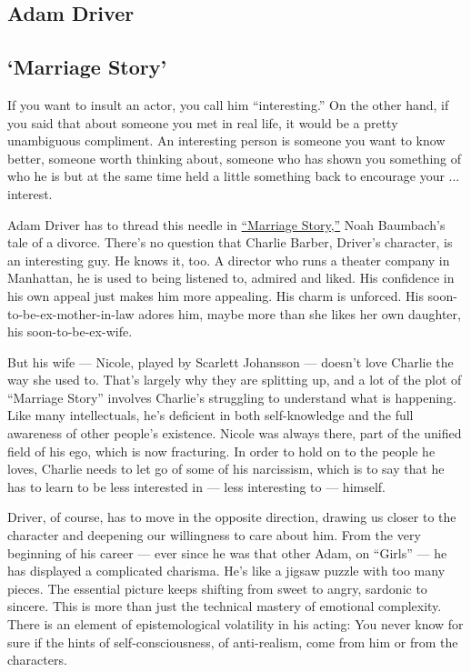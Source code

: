 \hypertarget{adam-driver}{%
\subsection{Adam Driver}\label{adam-driver}}

\hypertarget{marriage-story}{%
\subsection{`Marriage Story'}\label{marriage-story}}

If you want to insult an actor, you call him ``interesting.'' On the
other hand, if you said that about someone you met in real life, it
would be a pretty unambiguous compliment. An interesting person is
someone you want to know better, someone worth thinking about, someone
who has shown you something of who he is but at the same time held a
little something back to encourage your ... interest.

Adam Driver has to thread this needle in
\href{https://www.nytimes3xbfgragh.onion/2019/11/05/movies/marriage-story-review.html}{``Marriage
Story,''} Noah Baumbach's tale of a divorce. There's no question that
Charlie Barber, Driver's character, is an interesting guy. He knows it,
too. A director who runs a theater company in Manhattan, he is used to
being listened to, admired and liked. His confidence in his own appeal
just makes him more appealing. His charm is unforced. His
soon-to-be-ex-mother-in-law adores him, maybe more than she likes her
own daughter, his soon-to-be-ex-wife.

But his wife --- Nicole, played by Scarlett Johansson --- doesn't love
Charlie the way she used to. That's largely why they are splitting up,
and a lot of the plot of ``Marriage Story'' involves Charlie's
struggling to understand what is happening. Like many intellectuals,
he's deficient in both self-knowledge and the full awareness of other
people's existence. Nicole was always there, part of the unified field
of his ego, which is now fracturing. In order to hold on to the people
he loves, Charlie needs to let go of some of his narcissism, which is to
say that he has to learn to be less interested in --- less interesting
to --- himself.

Driver, of course, has to move in the opposite direction, drawing us
closer to the character and deepening our willingness to care about him.
From the very beginning of his career --- ever since he was that other
Adam, on ``Girls'' --- he has displayed a complicated charisma. He's
like a jigsaw puzzle with too many pieces. The essential picture keeps
shifting from sweet to angry, sardonic to sincere. This is more than
just the technical mastery of emotional complexity. There is an element
of epistemological volatility in his acting: You never know for sure if
the hints of self-consciousness, of anti-realism, come from him or from
the characters.

